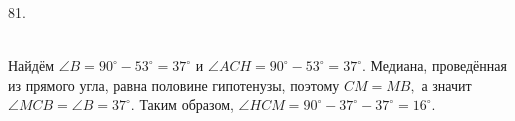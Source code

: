 81. \begin{figure}[ht!]
\end{figure}\\
Найдём $\angle B=90^\circ-53^\circ=37^\circ$ и $\angle ACH=90^\circ-53^\circ=37^\circ.$ Медиана, проведённая из прямого угла, равна половине гипотенузы, поэтому $CM=MB,$ а значит $\angle MCB=\angle B=37^\circ.$ Таким образом, $\angle HCM=90^\circ-37^\circ-37^\circ=16^\circ.$\\
